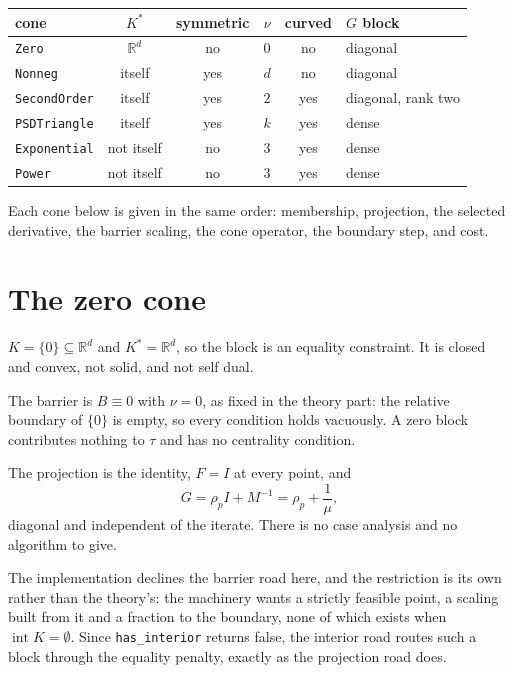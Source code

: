 \documentclass[a4paper,11pt]{book}
\theoremstyle{plain}
\theoremstyle{definition}
\theoremstyle{remark}
\numberwithin{equation}{chapter}
\numberwithin{algorithm}{chapter}
\newcommand{\R}{\mathbb{R}}
\newcommand{\intr}{\operatorname{int}}
\begin{document}
	\begin{table}[H]
		\centering\small
		\begin{tabular}{lccccl}
			\toprule
			cone & $K^*$ & symmetric & $\nu$ & curved & $G$ block\\
			\midrule
			\texttt{Zero} & $\R^d$ & no & $0$ & no & diagonal\\
			\texttt{Nonneg} & itself & yes & $d$ & no & diagonal\\
			\texttt{SecondOrder} & itself & yes & $2$ & yes & diagonal, rank two\\
			\texttt{PSDTriangle} & itself & yes & $k$ & yes & dense\\
			\texttt{Exponential} & not itself & no & $3$ & yes & dense\\
			\texttt{Power} & not itself & no & $3$ & yes & dense\\
			\bottomrule
		\end{tabular}
	\end{table}

	Each cone below is given in the same order: membership, projection, the
	selected derivative, the barrier scaling, the cone operator, the boundary
	step, and cost.

	\section{The zero cone}

	$K=\{0\}\subseteq\R^d$ and $K^*=\R^d$, so the block is an equality constraint.
	It is closed and convex, not solid, and not self dual.

	The barrier is $B\equiv0$ with $\nu=0$, as fixed in the theory part: the
	relative boundary of $\{0\}$ is empty, so every condition holds vacuously. A
	zero block contributes nothing to $\tau$ and has no centrality condition.

	The projection is the identity, $F=I$ at every point, and
	\[
	G=\rho_pI+M^{-1}=\rho_p+\frac1\mu ,
	\]
	diagonal and independent of the iterate. There is no case analysis and no
	algorithm to give.

	The implementation declines the barrier road here, and the restriction is its
	own rather than the theory's: the machinery wants a strictly feasible point, a
	scaling built from it and a fraction to the boundary, none of which exists
	when $\intr K=\emptyset$. Since \texttt{has\_interior} returns false, the
	interior road routes such a block through the equality penalty, exactly as the
	projection road does.
\end{document}
